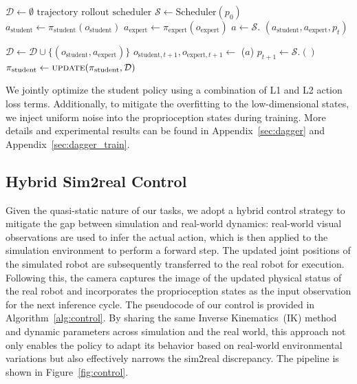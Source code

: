 \begin{algorithm}
\caption{DAgger Distillation Training}\label{alg:training}
\begin{algorithmic}

\State $\mathcal{D} \gets \emptyset$
\State $\text{trajectory rollout scheduler } \mathcal{S} \gets \text{Scheduler}(p_0)$
     
        \State $a_{\text{student}} \gets \pi_\text{student}(o_{\text{student}})$
        \State $a_{\text{expert}} \gets \pi_\text{expert}(o_{\text{expert}})$
        \State $a \gets \mathcal{S}$. $(a_{\text{student}}, a_{\text{expert}}, p_t)$
        
        \State $\mathcal{D} \gets \mathcal{D} \cup \{(o_{\text{student}}, a_{\text{expert}})\}$
        \State $o_{\text{student}, t+1}, o_{\text{expert}, t+1} \gets$ ($a$)
        \State $p_{t+1} \gets \mathcal{S}$.$()$ 
    \EndFor
    \State $\pi_\text{student} \gets \textproc{update}(\pi_\text{student}, \mathcal{D})$ 
\EndFor
\end{algorithmic}
\end{algorithm}

We jointly optimize the student policy using a combination of L1 and L2 action loss terms. Additionally, to mitigate the  overfitting to the low-dimensional states, we inject uniform noise into the proprioception states during training. More details and experimental results can be found in Appendix~\ref{sec:dagger} and Appendix~\ref{sec:dagger_train}. 


\subsection{Hybrid Sim2real Control}
Given the quasi-static nature of our tasks, we adopt a hybrid control strategy to mitigate the gap between simulation and real-world dynamics: real-world visual observations are used to infer the actual action, which is then applied to the simulation environment to perform a forward step. The updated joint positions of the simulated robot are subsequently transferred to the real robot for execution. Following this, the camera captures the image of the updated physical status of the real robot and incorporates the proprioception states as the input observation for the next inference cycle. The pseudocode of our control is provided in Algorithm~\ref{alg:control}.
By sharing the same Inverse Kinematics~(IK) method and dynamic parameters across simulation and the real world, this approach not only enables the policy to adapt its behavior based on real-world environmental variations but also effectively narrows the sim2real discrepancy. The pipeline is shown in Figure~\ref{fig:control}. 


